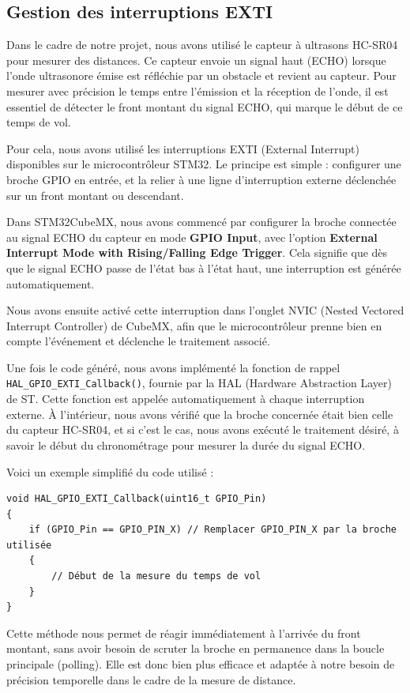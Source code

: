 \documentclass{article}
\begin{document}
    \subsection*{Gestion des interruptions EXTI}

Dans le cadre de notre projet, nous avons utilisé le capteur à ultrasons HC-SR04 pour mesurer des distances. Ce capteur envoie un signal haut (ECHO) lorsque l’onde ultrasonore émise est réfléchie par un obstacle et revient au capteur. Pour mesurer avec précision le temps entre l’émission et la réception de l’onde, il est essentiel de détecter le front montant du signal ECHO, qui marque le début de ce temps de vol.

Pour cela, nous avons utilisé les interruptions EXTI (External Interrupt) disponibles sur le microcontrôleur STM32. Le principe est simple : configurer une broche GPIO en entrée, et la relier à une ligne d'interruption externe déclenchée sur un front montant ou descendant.

Dans STM32CubeMX, nous avons commencé par configurer la broche connectée au signal ECHO du capteur en mode \textbf{GPIO Input}, avec l'option \textbf{External Interrupt Mode with Rising/Falling Edge Trigger}. Cela signifie que dès que le signal ECHO passe de l'état bas à l'état haut, une interruption est générée automatiquement.

Nous avons ensuite activé cette interruption dans l’onglet NVIC (Nested Vectored Interrupt Controller) de CubeMX, afin que le microcontrôleur prenne bien en compte l’événement et déclenche le traitement associé.

Une fois le code généré, nous avons implémenté la fonction de rappel \texttt{HAL\_GPIO\_EXTI\_Callback()}, fournie par la HAL (Hardware Abstraction Layer) de ST. Cette fonction est appelée automatiquement à chaque interruption externe. À l'intérieur, nous avons vérifié que la broche concernée était bien celle du capteur HC-SR04, et si c’est le cas, nous avons exécuté le traitement désiré, à savoir le début du chronométrage pour mesurer la durée du signal ECHO.

Voici un exemple simplifié du code utilisé :

\begin{verbatim}
void HAL_GPIO_EXTI_Callback(uint16_t GPIO_Pin)
{
    if (GPIO_Pin == GPIO_PIN_X) // Remplacer GPIO_PIN_X par la broche utilisée
    {
        // Début de la mesure du temps de vol
    }
}
\end{verbatim}

Cette méthode nous permet de réagir immédiatement à l’arrivée du front montant, sans avoir besoin de scruter la broche en permanence dans la boucle principale (polling). Elle est donc bien plus efficace et adaptée à notre besoin de précision temporelle dans le cadre de la mesure de distance.
\end{document}

